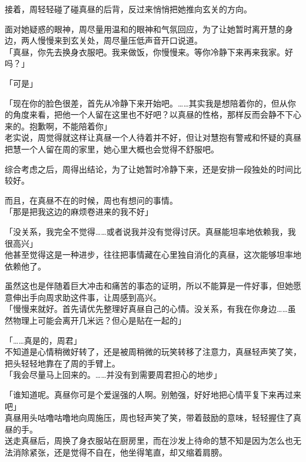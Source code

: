 接着，周轻轻碰了碰真昼的后背，反过来悄悄把她推向玄关的方向。

面对她疑惑的眼神，周尽量用温和的眼神和气氛回应，为了让她暂时离开慧的身边，两人慢慢来到玄关处，周尽量压低声音开口说道。\\

「真昼，你先去换身衣服吧。我来做饭，你慢慢来。等你冷静下来再来我家。好吗？」

「可是」

「现在你的脸色很差，首先从冷静下来开始吧。……其实我是想陪着你的，但从你的角度来看，把他一个人留在这里也不好吧？以真昼的性格，那样反而会静不下心来的。抱歉啊，不能陪着你」\\

老实说，周觉得就这样让真昼一个人待着并不好，但让对慧抱有警戒和怀疑的真昼把慧一个人留在周的家里，她心里大概也会觉得不舒服吧。

综合考虑之后，周得出结论，为了让她暂时冷静下来，还是安排一段独处的时间比较好。

而且，在真昼不在的时候，周也有想问的事情。\\

「那是把我这边的麻烦卷进来的我不好」

「没关系，我完全不觉得……或者说我并没有觉得讨厌。真昼能坦率地依赖我，我很高兴」\\

他甚至觉得这是一种进步，往往把事情藏在心里独自消化的真昼，这次能够坦率地依赖他了。

虽然这也是伴随着巨大冲击和痛苦的事态的证明，所以不能算是一件好事，但她愿意伸出手向周求助这件事，让周感到高兴。\\

「慢慢来就好。首先请优先整理好真昼自己的心情。没关系，有我在你身边……虽然物理上可能会离开几米远？但心是贴在一起的」

「……真是的，周君」\\

不知道是心情稍微好转了，还是被周稍微的玩笑转移了注意力，真昼轻声笑了笑，把头轻轻地靠在了周的手臂上。\\

「我会尽量马上回来的。……并没有到需要周君担心的地步」

「谁知道呢。真昼你可是个爱逞强的人啊。别勉强，好好地把心情平复下来再过来吧」\\

真昼用头咕噜咕噜地向周施压，周也轻声笑了笑，带着鼓励的意味，轻轻握住了真昼的手。\\

送走真昼后，周换了身衣服站在厨房里，而在沙发上待命的慧不知是因为怎么也无法消除紧张，还是觉得不自在，他坐得笔直，却又缩着肩膀。\\

